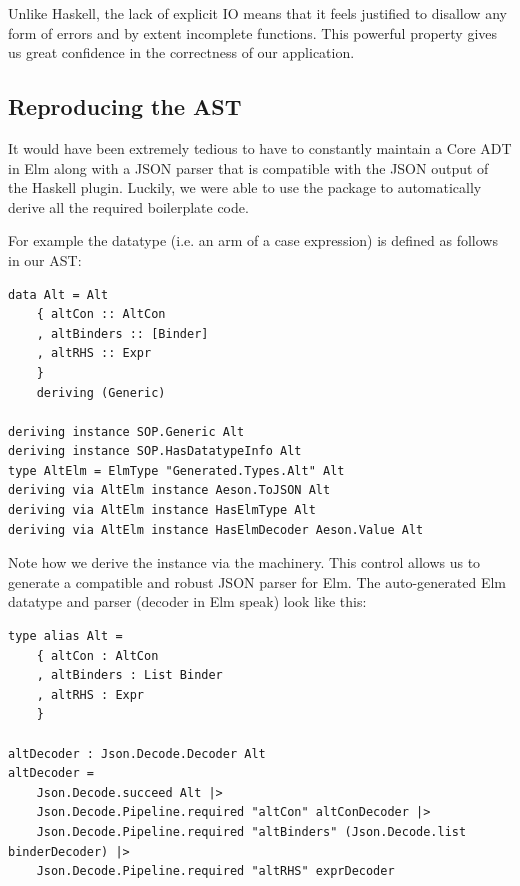 Unlike Haskell, the lack of explicit IO means that it feels justified to disallow any form of errors and by extent incomplete functions.
This powerful property gives us great confidence in the correctness of our application.

\subsection{Reproducing the AST}

It would have been extremely tedious to have to constantly maintain a Core ADT in Elm along with a JSON
parser that is compatible with the JSON output of the Haskell plugin. Luckily, we were able to use the
 \cite{haskell_to_elm} package to automatically derive all the required boilerplate code.

For example the  datatype (i.e. an arm of a case expression) is defined as follows in our AST:

\begin{listing}[H]
\begin{verbatim}
data Alt = Alt
    { altCon :: AltCon
    , altBinders :: [Binder]
    , altRHS :: Expr
    }
    deriving (Generic)

deriving instance SOP.Generic Alt
deriving instance SOP.HasDatatypeInfo Alt
type AltElm = ElmType "Generated.Types.Alt" Alt
deriving via AltElm instance Aeson.ToJSON Alt
deriving via AltElm instance HasElmType Alt
deriving via AltElm instance HasElmDecoder Aeson.Value Alt
\end{verbatim}
\end{listing}

Note how we derive the  instance via the  machinery. This control allows
us to generate a compatible and robust JSON parser for Elm. The auto-generated Elm datatype and parser
(decoder in Elm speak) look like this:

\begin{listing}[H]
\begin{verbatim}
type alias Alt =
    { altCon : AltCon
    , altBinders : List Binder
    , altRHS : Expr
    }

altDecoder : Json.Decode.Decoder Alt
altDecoder =
    Json.Decode.succeed Alt |>
    Json.Decode.Pipeline.required "altCon" altConDecoder |>
    Json.Decode.Pipeline.required "altBinders" (Json.Decode.list binderDecoder) |>
    Json.Decode.Pipeline.required "altRHS" exprDecoder
\end{verbatim}
\end{listing}

